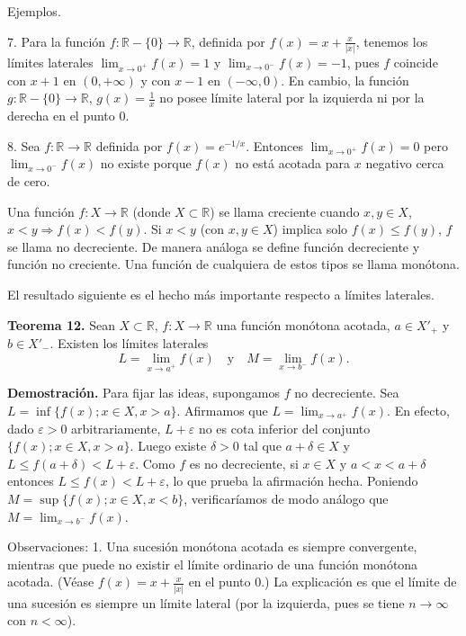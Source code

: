 \documentclass[12pt,oneside]{book}
\begin{document}
Ejemplos.

7. Para la función \( f: \mathbb{R} - \{0\} \to \mathbb{R} \), definida por \( f(x) = x + \frac{x}{|x|} \), tenemos los límites laterales \( \lim_{x \to 0^+} f(x) = 1 \) y \( \lim_{x \to 0^-} f(x) = -1 \), pues \( f \) coincide con \( x + 1 \) en \( (0, +\infty) \) y con \( x - 1 \) en \( (-\infty, 0) \). En cambio, la función \( g: \mathbb{R} - \{0\} \to \mathbb{R} \), \( g(x) = \frac{1}{x} \) no posee límite lateral por la izquierda ni por la derecha en el punto \( 0 \).

8. Sea \( f: \mathbb{R} \to \mathbb{R} \) definida por \( f(x) = e^{-1/x} \). Entonces \( \lim_{x \to 0^+} f(x) = 0 \) pero \( \lim_{x \to 0^-} f(x) \) no existe porque \( f(x) \) no está acotada para \( x \) negativo cerca de cero.

Una función \( f: X \to \mathbb{R} \) (donde \( X \subset \mathbb{R} \)) se llama creciente cuando \( x, y \in X \), \( x < y \Rightarrow f(x) < f(y) \). Si \( x < y \) (con \( x, y \in X \)) implica solo \( f(x) \leq f(y) \), \( f \) se llama no decreciente. De manera análoga se define función decreciente y función no creciente. Una función de cualquiera de estos tipos se llama monótona.

El resultado siguiente es el hecho más importante respecto a límites laterales.

\textbf{Teorema 12.} Sean \( X \subset \mathbb{R} \), \( f: X \to \mathbb{R} \) una función monótona acotada, \( a \in X'_+ \) y \( b \in X'_- \). Existen los límites laterales
\[
L = \lim_{x \to a^+} f(x) \quad \text{y} \quad M = \lim_{x \to b^-} f(x).
\]

\textbf{Demostración.} Para fijar las ideas, supongamos \( f \) no decreciente. Sea \( L = \inf\{f(x); x \in X, x > a\} \). Afirmamos que \( L = \lim_{x \to a^+} f(x) \). En efecto, dado \( \varepsilon > 0 \) arbitrariamente, \( L + \varepsilon \) no es cota inferior del conjunto \( \{f(x); x \in X, x > a\} \). Luego existe \( \delta > 0 \) tal que \( a + \delta \in X \) y \( L \leq f(a + \delta) < L + \varepsilon \). Como \( f \) es no decreciente, si \( x \in X \) y \( a < x < a + \delta \) entonces \( L \leq f(x) < L + \varepsilon \), lo que prueba la afirmación hecha. Poniendo \( M = \sup\{f(x); x \in X, x < b\} \), verificaríamos de modo análogo que \( M = \lim_{x \to b^-} f(x) \).

Observaciones: 1. Una sucesión monótona acotada es siempre convergente, mientras que puede no existir el límite ordinario de una función monótona acotada. (Véase \(f(x) = x + \frac{x}{|x|}\) en el punto 0.) La explicación es que el límite de una sucesión es siempre un límite lateral (por la izquierda, pues se tiene \(n \to \infty\) con \(n < \infty\)).
\end{document}
